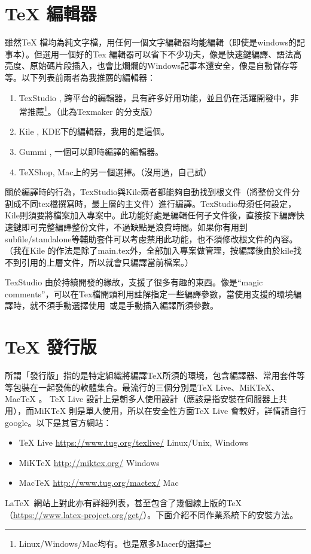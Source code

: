 \documentclass[class=NCU_thesis, crop=false, float=true]{standalone}
\begin{document}
\section{TeX 編輯器}
雖然TeX 檔均為純文字檔，用任何一個文字編輯器均能編輯（即使是windows的記事本）。但選用一個好的Tex 編輯器可以省下不少功夫，像是快速鍵編譯、語法高亮度、原始碼片段插入，也會比爛爛的Windows記事本還安全，像是自動儲存等等。以下列表前兩者為我推薦的編輯器：
\begin{enumerate}
    \item TexStudio , 跨平台的編輯器，具有許多好用功能，並且仍在活躍開發中，非常推薦\footnote{Linux/Windows/Mac均有。也是眾多Macer的選擇}。（此為Texmaker 的分支版）
    \item Kile , KDE下的編輯器，我用的是這個。
    \item Gummi , 一個可以即時編譯的編輯器。
    \item TeXShop, Mac上的另一個選擇。（沒用過，自己試） 
\end{enumerate}
關於編譯時的行為，TexStudio與Kile兩者都能夠自動找到根文件（將整份文件分割成不同tex檔撰寫時，最上層的主文件）進行編譯。TexStudio毋須任何設定，Kile則須要將檔案加入專案中。此功能好處是編輯任何子文件後，直接按下編譯快速鍵即可完整編譯整份文件，不過缺點是浪費時間。如果你有用到subfile/standalone等輔助套件可以考慮禁用此功能，也不須修改根文件的內容。（我在Kile 的作法是除了main.tex外，全部加入專案做管理，按編譯後由於kile找不到引用的上層文件，所以就會只編譯當前檔案。）

TexStudio 由於持續開發的緣故，支援了很多有趣的東西。像是``magic comments''，可以在Tex檔開頭利用註解指定一些編譯參數，當使用支援的環境編譯時，就不須手動選擇使用\XeLaTeX\ 或是手動插入編譯所須參數。

\section{TeX 發行版}
所謂「發行版」指的是特定組織將編譯TeX所須的環境，包含編譯器、常用套件等等包裝在一起發佈的軟體集合。最流行的三個分別是TeX Live、MiKTeX、MacTeX 。 TeX Live 設計上是朝多人使用設計（應該是指安裝在伺服器上共用），而MiKTeX 則是單人使用，所以在安全性方面TeX Live 會較好，詳情請自行google。以下是其官方網站：
\begin{itemize}
    \item TeX Live \url{https://www.tug.org/texlive/} Linux/Unix, Windows
    \item MiKTeX \url{http://miktex.org/} Windows
    \item MacTeX \url{http://www.tug.org/mactex/} Mac
\end{itemize}
\LaTeX\  網站上對此亦有詳細列表，甚至包含了幾個線上版的TeX（\url{https://www.latex-project.org/get/}）。下面介紹不同作業系統下的安裝方法。
\end{document}

